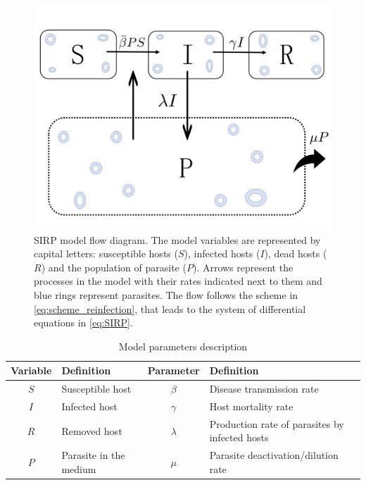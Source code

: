 \begin{figure}[H]
    \centering
    \includegraphics[width=1\textwidth]{Figures/SIRP_scheme_mod.jpg}
    \caption{SIRP model flow diagram. The model variables are represented
        by capital letters: susceptible hosts ($S$), infected hosts ($I$), dead
        hosts
        ($R$) and the population of parasite ($P$). Arrows represent the
        processes in
        the model with their rates indicated next to them and blue rings
        represent
        parasites. The flow follows the scheme in \cref{eq:scheme_reinfection},
        that
        leads to the system of differential equations in \cref{eq:SIRP}.}
    \label{fig: SIRP_scheme}
\end{figure}

\begin{table}[H]
    \centering
    \caption{Model parameters description}
    \begin{tabular}{cl:cl}
        \hline \hline
        Variable & Definition             & Parameter & Definition
        \\ \hline
        $S$      & Susceptible host       & $\beta$   & Disease transmission
        rate                                                                 \\
        $I$      & Infected host          & $\gamma$  & Host mortality rate
        \\
        $R$      & Removed host           & $\lambda$ & Production rate of
        parasites by
        infected hosts
        \\
        $P$      & Parasite in the medium & $\mu$     & Parasite
        deactivation/dilution rate
        \\ \hline \hline
    \end{tabular}
    \label{tab:parameters}
\end{table}

